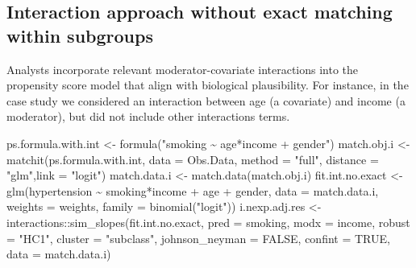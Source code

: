 \documentclass[
  letterpaper,
  DIV=11,
  numbers=noendperiod]{scrreprt}
\newenvironment{Shaded}{\begin{snugshade}}{\end{snugshade}}
\newcommand{\AttributeTok}[1]{\textcolor[rgb]{0.40,0.45,0.13}{#1}}
\newcommand{\ConstantTok}[1]{\textcolor[rgb]{0.56,0.35,0.01}{#1}}
\newcommand{\FunctionTok}[1]{\textcolor[rgb]{0.28,0.35,0.67}{#1}}
\newcommand{\NormalTok}[1]{\textcolor[rgb]{0.00,0.23,0.31}{#1}}
\newcommand{\OtherTok}[1]{\textcolor[rgb]{0.00,0.23,0.31}{#1}}
\newcommand{\SpecialCharTok}[1]{\textcolor[rgb]{0.37,0.37,0.37}{#1}}
\newcommand{\StringTok}[1]{\textcolor[rgb]{0.13,0.47,0.30}{#1}}
\begin{document}
\hypertarget{interaction-approach-without-exact-matching-within-subgroups}{%
\subsection{Interaction approach without exact matching within
subgroups}\label{interaction-approach-without-exact-matching-within-subgroups}}

Analysts incorporate relevant moderator-covariate interactions into the
propensity score model that align with biological plausibility. For
instance, in the case study we considered an interaction between age (a
covariate) and income (a moderator), but did not include other
interactions terms.

\begin{Shaded}
\begin{Highlighting}[]
\NormalTok{ps.formula.with.int }\OtherTok{\textless{}{-}} \FunctionTok{formula}\NormalTok{(}\StringTok{"smoking \textasciitilde{} age*income + gender"}\NormalTok{)}
\NormalTok{match.obj.i }\OtherTok{\textless{}{-}} \FunctionTok{matchit}\NormalTok{(ps.formula.with.int, }\AttributeTok{data =}\NormalTok{ Obs.Data,}
                       \AttributeTok{method =} \StringTok{"full"}\NormalTok{, }\AttributeTok{distance =} \StringTok{"glm"}\NormalTok{,}\AttributeTok{link =} \StringTok{"logit"}\NormalTok{)}
\NormalTok{match.data.i }\OtherTok{\textless{}{-}} \FunctionTok{match.data}\NormalTok{(match.obj.i)}
\NormalTok{fit.int.no.exact }\OtherTok{\textless{}{-}} \FunctionTok{glm}\NormalTok{(hypertension }\SpecialCharTok{\textasciitilde{}}\NormalTok{ smoking}\SpecialCharTok{*}\NormalTok{income }\SpecialCharTok{+}\NormalTok{ age }\SpecialCharTok{+}\NormalTok{ gender, }
                        \AttributeTok{data =}\NormalTok{ match.data.i, }\AttributeTok{weights =}\NormalTok{ weights,}
                        \AttributeTok{family =} \FunctionTok{binomial}\NormalTok{(}\StringTok{"logit"}\NormalTok{))}
\NormalTok{i.nexp.adj.res }\OtherTok{\textless{}{-}}\NormalTok{ interactions}\SpecialCharTok{::}\FunctionTok{sim\_slopes}\NormalTok{(fit.int.no.exact, }
                                           \AttributeTok{pred =}\NormalTok{ smoking, }
                                           \AttributeTok{modx =}\NormalTok{ income,}
                                           \AttributeTok{robust =} \StringTok{"HC1"}\NormalTok{, }
                                           \AttributeTok{cluster =} \StringTok{"subclass"}\NormalTok{,}
                                           \AttributeTok{johnson\_neyman =} \ConstantTok{FALSE}\NormalTok{, }
                                           \AttributeTok{confint =} \ConstantTok{TRUE}\NormalTok{,}
                                           \AttributeTok{data =}\NormalTok{ match.data.i)}
\end{Highlighting}
\end{Shaded}
\end{document}
